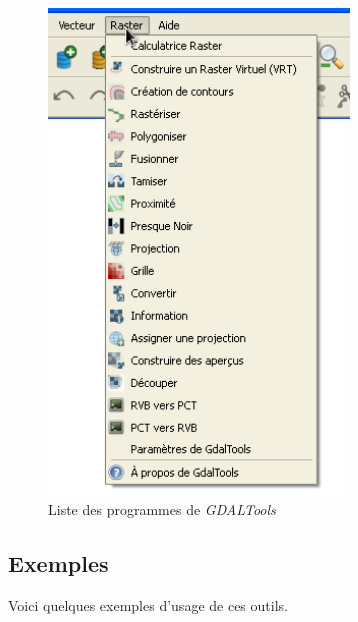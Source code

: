 {\begin{figure}[ht]
   \centering
   \caption{Liste des programmes de \emph{GDALTools} \nixcaption}\label{gdaltools_menu}
   \includegraphics[clip=true, width=8cm]{plugins_gdaltools_images/raster_menu}
\end{figure}

\subsection{Exemples}\label{gdal_examples}
Voici quelques exemples d'usage de ces outils.
}
